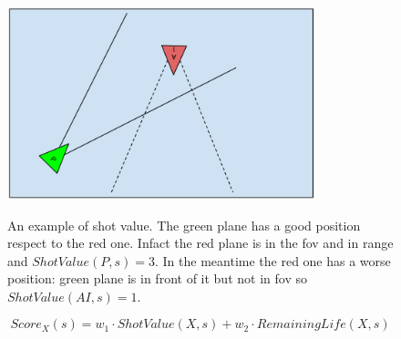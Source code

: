 \begin{figure}
  \centering
  \includegraphics[width=0.8\textwidth]{images/planefov.png}
  \label{img:planefov}
  \caption{An example of shot value. The green plane has a good position respect to the
  red one. Infact the red plane is in the fov and in range and $ShotValue(P,s)=3$. In the
  meantime the red one has a worse position: green plane is in front of it but not in fov so
  $ShotValue(AI,s)=1$.}
\end{figure}

\begin{equation}
  Score_X(s) = w_1 \cdot ShotValue(X,s) + w_2 \cdot RemainingLife(X,s)
  \label{eq:heuristicscore}
\end{equation}


